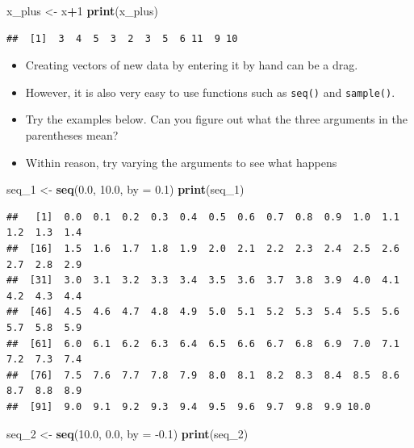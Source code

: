 \documentclass[]{book}
\newenvironment{Shaded}{\begin{snugshade}}{\end{snugshade}}
\newcommand{\DataTypeTok}[1]{\textcolor[rgb]{0.13,0.29,0.53}{#1}}
\newcommand{\DecValTok}[1]{\textcolor[rgb]{0.00,0.00,0.81}{#1}}
\newcommand{\FloatTok}[1]{\textcolor[rgb]{0.00,0.00,0.81}{#1}}
\newcommand{\KeywordTok}[1]{\textcolor[rgb]{0.13,0.29,0.53}{\textbf{#1}}}
\newcommand{\NormalTok}[1]{#1}
\newcommand{\OperatorTok}[1]{\textcolor[rgb]{0.81,0.36,0.00}{\textbf{#1}}}
\newcommand{\StringTok}[1]{\textcolor[rgb]{0.31,0.60,0.02}{#1}}
\begin{document}
\begin{Shaded}
\begin{Highlighting}[]
\NormalTok{x_plus <-}\StringTok{ }\NormalTok{x}\OperatorTok{+}\DecValTok{1}
\KeywordTok{print}\NormalTok{(x_plus)}
\end{Highlighting}
\end{Shaded}

\begin{verbatim}
##  [1]  3  4  5  3  2  3  5  6 11  9 10
\end{verbatim}

\begin{itemize}
\item
  Creating vectors of new data by entering it by hand can be a drag.
\item
  However, it is also very easy to use functions such as \texttt{seq()} and \texttt{sample()}.
\item
  Try the examples below. Can you figure out what the three arguments in the parentheses mean?
\item
  Within reason, try varying the arguments to see what happens
\end{itemize}

\begin{Shaded}
\begin{Highlighting}[]
\NormalTok{seq_}\DecValTok{1}\NormalTok{ <-}\StringTok{ }\KeywordTok{seq}\NormalTok{(}\FloatTok{0.0}\NormalTok{, }\FloatTok{10.0}\NormalTok{, }\DataTypeTok{by =} \FloatTok{0.1}\NormalTok{)}
\KeywordTok{print}\NormalTok{(seq_}\DecValTok{1}\NormalTok{)}
\end{Highlighting}
\end{Shaded}

\begin{verbatim}
##   [1]  0.0  0.1  0.2  0.3  0.4  0.5  0.6  0.7  0.8  0.9  1.0  1.1  1.2  1.3  1.4
##  [16]  1.5  1.6  1.7  1.8  1.9  2.0  2.1  2.2  2.3  2.4  2.5  2.6  2.7  2.8  2.9
##  [31]  3.0  3.1  3.2  3.3  3.4  3.5  3.6  3.7  3.8  3.9  4.0  4.1  4.2  4.3  4.4
##  [46]  4.5  4.6  4.7  4.8  4.9  5.0  5.1  5.2  5.3  5.4  5.5  5.6  5.7  5.8  5.9
##  [61]  6.0  6.1  6.2  6.3  6.4  6.5  6.6  6.7  6.8  6.9  7.0  7.1  7.2  7.3  7.4
##  [76]  7.5  7.6  7.7  7.8  7.9  8.0  8.1  8.2  8.3  8.4  8.5  8.6  8.7  8.8  8.9
##  [91]  9.0  9.1  9.2  9.3  9.4  9.5  9.6  9.7  9.8  9.9 10.0
\end{verbatim}

\begin{Shaded}
\begin{Highlighting}[]
\NormalTok{seq_}\DecValTok{2}\NormalTok{ <-}\StringTok{ }\KeywordTok{seq}\NormalTok{(}\FloatTok{10.0}\NormalTok{, }\FloatTok{0.0}\NormalTok{, }\DataTypeTok{by =} \FloatTok{-0.1}\NormalTok{)}
\KeywordTok{print}\NormalTok{(seq_}\DecValTok{2}\NormalTok{)}
\end{Highlighting}
\end{Shaded}
\end{document}
